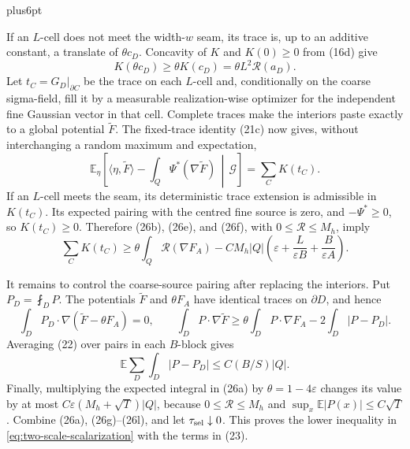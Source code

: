 \documentclass[11pt,reqno]{amsart}
\makeatletter
\theoremstyle{plain}
\theoremstyle{definition}
\theoremstyle{remark}
\renewenvironment{proof}[1][\proofname]{%
  \par
  \pushQED{\qed}%
  \normalfont
  \topsep6pt plus6pt\relax
  \trivlist
  \item[\hskip\labelsep\slshape #1\@addpunct{.}]%
  \ignorespaces
}{%
  \popQED
  \endtrivlist
  \@endpefalse
}
\DeclareRobustCommand{\qed}{%
  \leavevmode\unskip\penalty9999\hbox{}\nobreak
  \ifmmode
    \makebox[0pt][l]{\qquad\hbox{\qedsymbol}}%
  \else
    \qquad\hbox{\qedsymbol}%
  \fi
}
\renewcommand{\qedsymbol}{\rule[.47pt]{4pt}{6pt}}
\numberwithin{equation}{section}
\newcommand{\1}{\mathbf 1}
\makeatother
\begin{document}
\begin{proof}
If an $L$-cell does not meet the width-$w$ seam, its trace is, up to an
additive constant, a translate of $\theta c_ D$.  Concavity of $K$ and
$K(0)\geq0$ from (16d) give
\begin{equation}
K(\theta c_ D)\geq\theta K(c_ D)=\theta L^2\mathcal R(a_ D).
\tag{26f}
\end{equation}
Let $t_ C=G_ D|_ {\partial C}$ be the trace on each $L$-cell and,
conditionally on the coarse sigma-field, fill it by a measurable
realization-wise optimizer for the independent fine Gaussian vector in
that cell.  Complete traces make the interiors paste exactly to a global
potential $\widetilde F$.  The fixed-trace identity (21c) now gives,
without interchanging a random maximum and expectation,
\begin{equation}
\mathbb E_ \eta\!\left[
\langle\eta,\widetilde F\rangle-
\int_ Q\Psi^*(\nabla\widetilde F)\,\middle|\,\mathscr G\right]
=\sum_ CK(t_ C).
\tag{26g}
\end{equation}
If an $L$-cell meets the seam, its deterministic trace extension is
admissible in $K(t_ C)$.  Its expected pairing with the centred fine
source is zero, and $-\Psi^*\geq0$, so $K(t_ C)\geq0$.  Therefore
(26b), (26e), and (26f), with $0\leq \mathcal R\leq M_ h$, imply
\begin{equation}
\sum_ CK(t_ C)\geq\theta\int_ Q\mathcal R(\nabla F_ A)
-CM_ h|Q|\left(\varepsilon+\frac{L}{\varepsilon B}
+\frac{B}{\varepsilon A}\right).
\tag{26h}
\end{equation}

It remains to control the coarse-source pairing after replacing the
interiors.  Put $P_ D=\fint_ DP$.  The potentials
$\widetilde F$ and $\theta F_ A$ have identical traces on
$\partial D$, and hence
\begin{equation}
\int_ DP_ D\cdot\nabla(\widetilde F-\theta F_ A)=0,
\qquad
\int_ DP\cdot\nabla\widetilde F
\geq\theta\int_ DP\cdot\nabla F_ A-2\int_ D|P-P_ D|.
\tag{26k}
\end{equation}
Averaging (22) over pairs in each $B$-block gives
\begin{equation}
\mathbb E\sum_ D\int_ D|P-P_ D|\leq C(B/S)|Q|.
\tag{26l}
\end{equation}
Finally, multiplying the expected integral in (26a) by
$\theta=1-4\varepsilon$ changes its value by at most
$C\varepsilon(M_ h+\sqrt T)|Q|$, because
$0\leq \mathcal R\leq M_ h$ and $\sup_ x\mathbb E|P(x)|\leq C\sqrt T$.
Combine (26a), (26g)--(26l), and let $\tau_{\rm sel}\downarrow0$.  This proves
the lower inequality in \eqref{eq:two-scale-scalarization} with the
terms in (23).


\end{proof}
\end{document}
